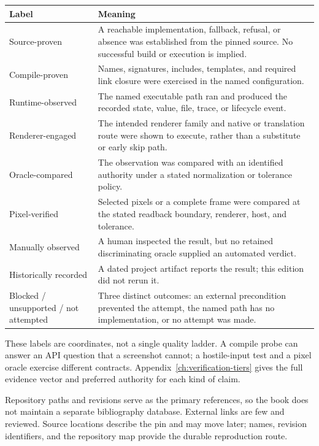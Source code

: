 \begin{center}
\small
\begin{tabularx}{\textwidth}{>{\raggedright\arraybackslash}p{3.0cm}X}
\toprule
\textbf{Label} & \textbf{Meaning} \\
\midrule
Source-proven & A reachable implementation, fallback, refusal, or absence was established from
  the pinned source. No successful build or execution is implied. \\
Compile-proven & Names, signatures, includes, templates, and required link closure were exercised
  in the named configuration. \\
Runtime-observed & The named executable path ran and produced the recorded state, value, file,
  trace, or lifecycle event. \\
Renderer-engaged & The intended renderer family and native or translation route were shown to
  execute, rather than a substitute or early skip path. \\
Oracle-compared & The observation was compared with an identified authority under a stated
  normalization or tolerance policy. \\
Pixel-verified & Selected pixels or a complete frame were compared at the stated readback boundary,
  renderer, host, and tolerance. \\
Manually observed & A human inspected the result, but no retained discriminating oracle supplied
  an automated verdict. \\
Historically recorded & A dated project artifact reports the result; this edition did not rerun it. \\
Blocked / unsupported / not attempted & Three distinct outcomes: an external precondition
  prevented the attempt, the named path has no implementation, or no attempt was made. \\
\bottomrule
\end{tabularx}
\end{center}

These labels are coordinates, not a single quality ladder. A compile probe can answer an API
question that a screenshot cannot; a hostile-input test and a pixel oracle exercise different
contracts. Appendix~\ref{ch:verification-tiers} gives the full evidence vector and preferred
authority for each kind of claim.

Repository paths and revisions serve as the primary references, so the book does not maintain a
separate bibliography database. External links are few and reviewed. Source locations describe
the pin and may move later; names, revision identifiers, and the repository map provide the
durable reproduction route.

